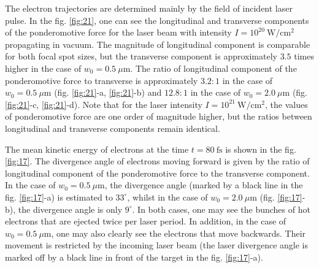 The electron trajectories are determined mainly by the field of incident laser pulse. In the fig. \ref{fig:21}, one can see the longitudinal and transverse components of the ponderomotive force for the laser beam with intensity $ I = 10^{20} \ \mathrm{W/cm^2} $ propagating in vacuum. The magnitude of longitudinal component is comparable for both focal spot sizes, but the transverse component is approximately $ 3.5 $ times higher in the case of $ w_0 = 0.5 \ \mu\mathrm{m} $. The ratio of longitudinal component of the ponderomotive force to transverse is approximately $ 3.2:1 $ in the case of $ w_0 = 0.5 \ \mu\mathrm{m} $ (fig. \ref{fig:21}-a, \ref{fig:21}-b) and $ 12.8:1 $ in the case of $ w_0 = 2.0 \ \mu\mathrm{m} $ (fig. \ref{fig:21}-c, \ref{fig:21}-d). Note that for the laser intensity $ I = 10^{21} \ \mathrm{W/cm^2} $, the values of ponderomotive force are one order of magnitude higher, but the ratios between longitudinal and transverse components remain identical.

The mean kinetic energy of electrons at the time $ t = 80 \ \mathrm{fs} $ is shown in the fig. \ref{fig:17}. The divergence angle of electrons moving forward is given by the ratio of longitudinal component of the ponderomotive force to the transverse component. In the case of $ w_0 = 0.5 \ \mu\mathrm{m} $, the divergence angle (marked by a black line in the fig. \ref{fig:17}-a) is estimated to $ 33^{\circ} $, whilst in the case of $ w_0 = 2.0 \ \mu\mathrm{m} $ (fig. \ref{fig:17}-b), the divergence angle is only $ 9^{\circ} $. In both cases, one may see the bunches of hot electrons that are ejected twice per laser period. In addition, in the case of $ w_0 = 0.5 \ \mu\mathrm{m} $, one may also clearly see the electrons that move backwards. Their movement is restricted by the incoming laser beam (the laser divergence angle is marked off by a black line in front of the target in the fig. \ref{fig:17}-a).

